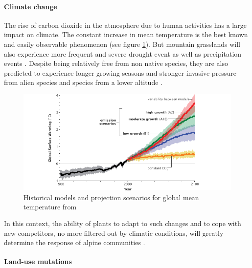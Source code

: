\paragraph{Climate change}

The rise of carbon dioxide in the atmosphere due to human activities has a large impact on climate. The constant increase in mean temperature is the best known and easily observable phenomenon (see figure \ref{fig:climate}). But mountain grasslands will also experience more frequent and severe drought event as well as precipitation events \parencite{beniston_climate_1997, solomon_climate_2007, intergovernmental_panel_on_climate_change_climate_2014}. Despite being relatively free from non native species, they are also predicted to experience longer growing seasons and stronger invasive pressure from alien species and species from a lower altitude \parencite{alexander_plant_2016}.


\begin{figure}
    \includegraphics[width=1\linewidth]{./1_Introduction/graphics/ipcc_scenarios.png}
  \caption[IPCC scenarios for global mean temperature]{Historical models and projection scenarios for global mean temperature from \citet{solomon_climate_2007} }
  \label{fig:climate}
\end{figure}

In this context, the ability of plants to adapt to such changes and to cope with new competitors, no more filtered out by climatic conditions, will greatly determine the response of alpine communities \parencite{alexander_novel_2015}.

\paragraph{Land-use mutations}

